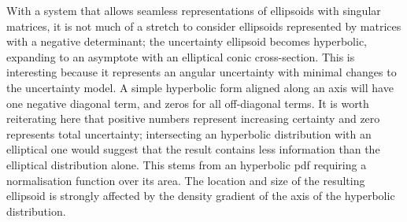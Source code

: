 \documentclass[a4paper, 11pt, titlepage]{article}
\newcounter{subsubsubsection}[subsubsection]
\begin{document}
        \label{sec:hyperbolicCase}
        With a system that allows seamless representations of ellipsoids with singular matrices, it is not much of a stretch to consider ellipsoids represented by matrices with a negative determinant; the uncertainty ellipsoid becomes hyperbolic, expanding to an asymptote with an elliptical conic cross-section.  This is interesting because it represents an angular uncertainty with minimal changes to the uncertainty model.
        A simple hyperbolic form aligned along an axis will have one negative diagonal term, and zeros for all off-diagonal terms.
        It is worth reiterating here that positive numbers represent increasing certainty and zero represents total uncertainty; intersecting an hyperbolic distribution with an elliptical one would suggest that the result contains less information than the elliptical distribution alone.
        This stems from an hyperbolic \gls{pdf} requiring a normalisation function over its area.  The location and size of the resulting ellipsoid is strongly affected by the density gradient of the axis of the hyperbolic distribution.
\end{document}
